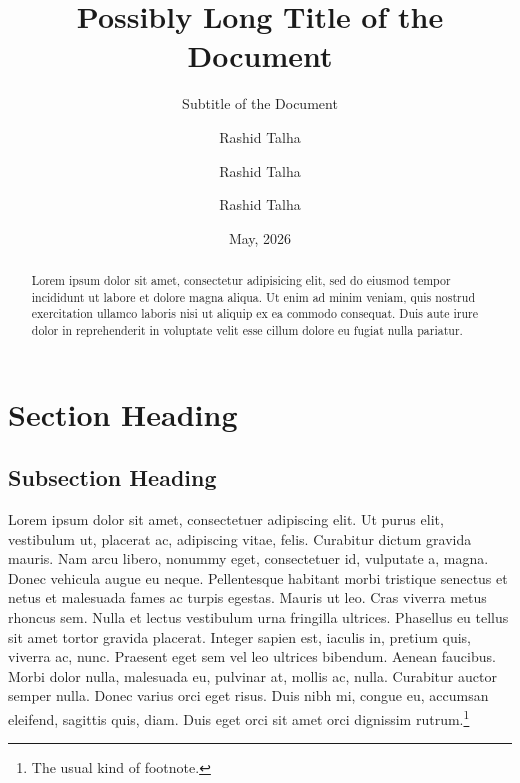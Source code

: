 \documentclass[10pt]{salam}
\begin{document}
\title[Short Custom Title]{Possibly Long Title of the Document}

\subtitle{Subtitle of the Document}

\author[*,5]{Rashid Talha}
\author{Rashid Talha}
\author[5]{Rashid Talha}


\date{May, 2026}

\maketitle %

\begin{abstract}
  Lorem ipsum dolor sit amet, consectetur adipisicing elit, sed do eiusmod tempor incididunt ut labore et dolore magna aliqua. Ut enim ad minim veniam, quis nostrud exercitation ullamco laboris nisi ut aliquip ex ea commodo consequat. Duis aute irure dolor in reprehenderit in voluptate velit esse cillum dolore eu fugiat nulla pariatur.
\end{abstract}

\tableofcontents

\section{Section Heading}
\subsection{Subsection Heading}
Lorem ipsum dolor sit amet, consectetuer adipiscing elit. Ut purus elit, vestibulum ut, placerat ac, adipiscing vitae, felis. Curabitur dictum gravida mauris. Nam arcu libero, nonummy eget, consectetuer id, vulputate a, magna. Donec vehicula augue eu neque. Pellentesque habitant morbi tristique senectus et netus et malesuada fames ac turpis egestas. Mauris ut leo. Cras viverra metus rhoncus sem. Nulla et lectus vestibulum urna fringilla ultrices. Phasellus eu tellus sit amet tortor gravida placerat. Integer sapien est, iaculis in, pretium quis, viverra ac, nunc. Praesent eget sem vel leo ultrices bibendum. Aenean faucibus. Morbi dolor nulla, malesuada eu, pulvinar at, mollis ac, nulla. Curabitur auctor semper nulla. Donec varius orci eget risus. Duis nibh mi, congue eu, accumsan eleifend, sagittis quis, diam. Duis eget orci sit amet orci dignissim rutrum.\footnote{The usual kind of footnote.}
\end{document}
